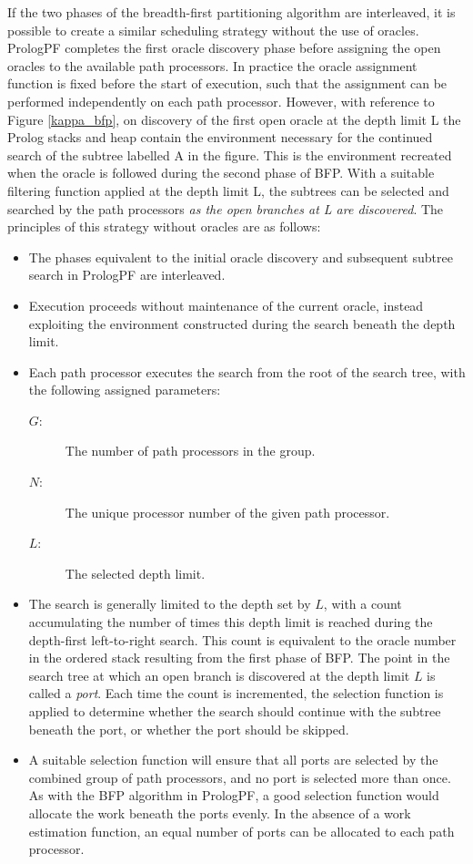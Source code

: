 If the two phases of the breadth-first partitioning algorithm are
interleaved, it is possible to create a similar scheduling strategy
without the use of oracles.  PrologPF completes the first oracle
discovery phase before assigning the open oracles to the available
path processors.  In practice the oracle assignment function is fixed
before the start of execution, such that the assignment can be
performed independently on each path processor.  However, with 
reference to Figure \ref{kappa_bfp}, on discovery of the first open
oracle at the depth limit L the Prolog stacks and heap contain the environment
necessary for the continued search of the subtree labelled A in the
figure.  This is the environment recreated when the oracle is followed
during the second phase of BFP.  With a suitable filtering function
applied at the depth limit L, the subtrees can be selected and searched
by the path processors \textit{as the open branches at L are discovered}.
The principles of this strategy without oracles are as follows:
\begin{itemize}
\item{The phases equivalent to the initial oracle discovery and 
  subsequent subtree search in PrologPF are interleaved.}
\item{Execution proceeds without maintenance of the current oracle,
  instead exploiting the environment constructed during the
  search beneath the depth limit.}
\item{Each path processor executes the search from the root of the
  search tree, with the following assigned parameters:
  \begin{description}
  \item[$G$: ]{The number of path processors in the group.}
  \item[$N$: ]{The unique processor number of the given path processor.}
  \item[$L$: ]{The selected depth limit.}
  \end{description}}
\item{The search is generally limited to the depth set by $L$, with a count
  accumulating the number of times this depth limit is reached during
  the depth-first left-to-right search.  This count is equivalent to the
  oracle number in the ordered stack resulting from the first phase of
  BFP.  The point in the search tree at which an open branch is discovered at
  the depth limit $L$ is called a \textit{port}.
  Each time the count is incremented, the selection function is
  applied to determine whether the search should continue with the subtree
  beneath the port, or whether the port should be skipped.}
\item{A suitable selection function will ensure that all ports are selected
  by the combined group of path processors, and no port is selected 
  more than once.  As with the BFP algorithm in PrologPF, a good selection
  function would allocate the work beneath the ports evenly.  In the
  absence of a work estimation function, an equal number of
  ports can be allocated to
  each path processor.}
\end{itemize}

